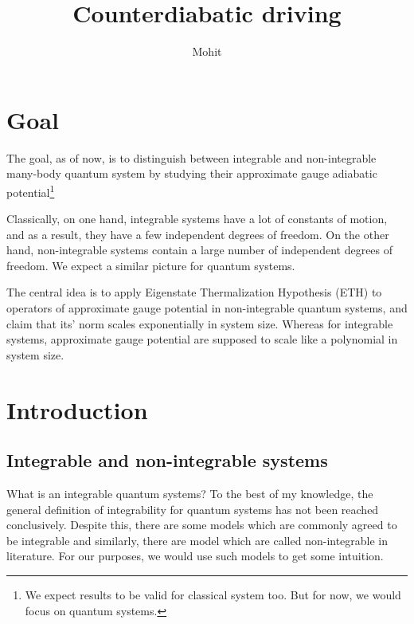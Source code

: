\documentclass[11pt,a4paper]{article}
\author{Mohit}
\title{Counterdiabatic driving}
\begin{document}
\maketitle

\section{Goal}

The goal, as of now, is to distinguish between integrable and non-integrable many-body quantum system by studying their approximate gauge adiabatic potential\footnote{We expect results to be valid for classical system too. But for now, we would focus on quantum systems.}

 
Classically, on one hand, integrable systems have a lot of constants of motion, and as a result, they have a few independent degrees of freedom. On the other hand, non-integrable systems contain a large number of independent degrees of freedom. We expect a similar picture for quantum systems.

The central idea is to apply Eigenstate Thermalization Hypothesis (ETH) to operators of approximate gauge potential in non-integrable quantum systems, and claim that its' norm scales exponentially in system 
size. Whereas for integrable systems, approximate gauge potential are supposed to scale like a polynomial in system size.

\section{Introduction}
\subsection{Integrable and non-integrable systems}
What is an integrable quantum systems? To the best of my knowledge, the general definition of integrability for quantum systems has not been reached conclusively. Despite this, there are some models which are commonly agreed to be integrable and similarly, there are model which are called non-integrable in literature. For our purposes, we would use such models to get some intuition.
\end{document}
